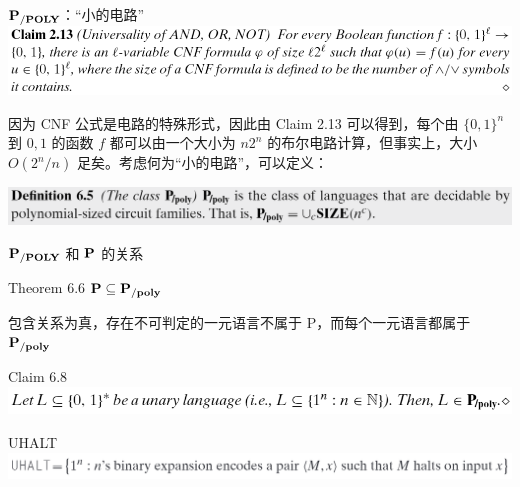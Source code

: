 \documentclass[UTF8,aspectratio=169,mathserif]{beamer}
\begin{document}
	\begin{frame}{$\bf P_{/POLY}$：“小的电路”}
		\includegraphics[width=\linewidth]{../../5 & 6/note.assets/image-20210427234507193.png}\newline
		
		因为 CNF 公式是电路的特殊形式，因此由 Claim 2.13 可以得到，每个由 $\{0,1\}^n$ 到 ${0,1}$ 的函数 $f$ 都可以由一个大小为 $n2^n$ 的布尔电路计算，但事实上，大小 $O(2^n/n)$ 足矣。考虑何为“小的电路”，可以定义：\newline
		
		\includegraphics[width=\linewidth]{../../5 & 6/note.assets/image-20210427143807606.png}
		
	\end{frame}

	\begin{frame}{$\bf P_{/POLY}$ 和 $\bf P$ 的关系}
		\begin{block}{Theorem 6.6}
			$\bf P\subseteq P_{/poly}$
		\end{block}
	
%		
		
		包含关系为真，存在不可判定的一元语言不属于 P，而每个一元语言都属于 $\bf P_{/poly}$
		
		\begin{block}{Claim 6.8}
			\includegraphics[width=0.8\linewidth]{../../5 & 6/note.assets/image-20210427235221740.png}
		\end{block}
	
		\begin{block}{UHALT}
			\includegraphics[width=\linewidth]{../../5 & 6/note.assets/image-20210427145209895.png}
		\end{block}
	\end{frame}
\end{document}
